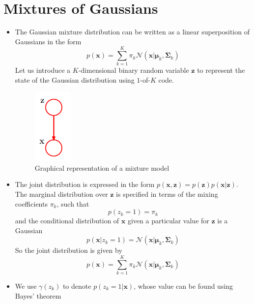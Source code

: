 \documentclass[12pt, a4paper]{article}
\newcommand{\N}{\mathcal{N}}
\begin{document}
    \section{Mixtures of Gaussians}
    \begin{itemize}
        \item The Gaussian mixture distribution can be written as a linear superposition
        of Gaussians in the form
        \begin{equation}
            p(\bm{x})=\sum_{k=1}^K\pi_k\N(\bm{x}|\bm{\mu}_k,\mathbf{\Sigma}_k)
        \end{equation}
        Let us introduce a $K$-dimensional binary random variable $\bm{z}$ to represent 
        the state of the Gaussian distribution using $1$-of-$K$ code. 
        \begin{figure}[htbp]
            \centering
            \includegraphics[width=0.75in]{figures/MixtureModel.PNG}
            \caption{Graphical representation of a mixture model}
        \end{figure}
        \item The joint distribution is expressed in the form $p(\bm{x},\bm{z})=p(\bm{z})
        p(\bm{x}|\bm{z})$. The marginal distribution over $\bm{z}$ is specified in terms 
        of the mixing coefficients $\pi_k$, such that
        \begin{equation}
            p(z_k=1)=\pi_k
        \end{equation}
        and the conditional distribution of $\bm{x}$ given a particular value for $\bm{z}$
        is a Gaussian 
        \begin{equation}
            p(\bm{x}|z_k=1)=\N(\bm{x}|\bm{\mu}_k,\mathbf{\Sigma}_k)
        \end{equation}
        So the joint distribution is given by
        \begin{equation}
            p(\bm{x})=\sum_{k=1}^K\pi_k\N(\bm{x}|\bm{\mu}_k,\mathbf{\Sigma}_k)
        \end{equation}
        \item We use $\gamma(z_k)$ to denote $p(z_k=1|\bm{x})$, whose value can be found
        using Bayes' theorem

\end{itemize}
\end{document}
